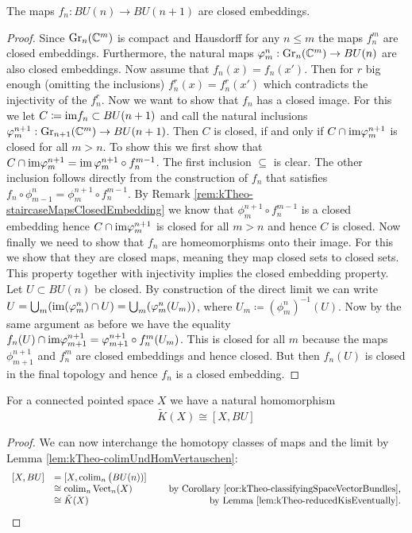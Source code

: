 \begin{lemma}
	The maps $f_n:BU(n)\to BU(n+1)$ are closed embeddings.
\end{lemma}
\begin{proof}
	Since $\operatorname{\mathrm{Gr}}_n(\mathbb{C}^m)$ is compact and Hausdorff for any $n\leq m$ the maps $f_n^m$ are closed embeddings. Furthermore, the natural maps $\varphi^n_m:\operatorname{\mathrm{Gr}}_n(\mathbb{C}^m)\to BU(n)$ are also closed embeddings. Now assume that $f_n(x)=f_n(x')$. Then for $r$ big enough (omitting the inclusions) $f_n^r(x)=f_n^r(x')$ which contradicts the injectivity of the $f_n^r$. Now we want to show that $f_n$ has a closed image. For this we let $C\coloneq \mathrm{im} f_n \subset BU(n+1)$ and call the natural inclusions $\varphi^{n+1}_m: \operatorname{\mathrm{Gr}}_{n+1}(\mathbb{C}^m)\to BU(n+1)$. Then $C$ is closed, if and only if $C\cap \mathrm{im} \varphi_m^{n+1}$ is closed for all $m>n$. To show this we first show that $C\cap \mathrm{im} \varphi_m^{n+1}=\mathrm{im}\, \varphi^{n+1}_m\circ f_n^{m-1}$. The first inclusion $\subseteq$ is clear. The other inclusion follows directly from the construction of $f_n$ that satisfies $f_n\circ \phi^n_{m-1}=\phi^{n+1}_m\circ f^{m-1}_n$. By Remark \ref{rem:kTheo-staircaseMapsClosedEmbedding} we know that $\phi^{n+1}_m \circ f^{m-1}_n$ is a closed embedding hence $C\cap \mathrm{im} \varphi_m^{n+1}$ is closed for all $m>n$ and hence $C$ is closed. Now finally we need to show that $f_n$ are homeomorphisms onto their image. For this we show that they are closed maps, meaning they map closed sets to closed sets. This property together with injectivity implies the closed embedding property.
	Let $U\subset BU(n)$ be closed. By construction of the direct limit we can write $U=\bigcup_m (\mathrm{im}(\varphi^n_m)\cap U)=\bigcup_m (\varphi^n_m(U_m))$, where $U_m\coloneq (\phi^n_m)^{-1}(U)$. Now by the same argument as before we have the equality $f_n(U)\cap \mathrm{im}\varphi^{n+1}_{m+1}= \varphi^{n+1}_{m+1}\circ f^m_n(U_m)$. This is closed for all $m$ because the maps $\phi^{n+1}_{m+1}$ and $f_n^m$ are closed embeddings and hence closed. But then $f_n(U)$ is closed in the final topology and hence $f_n$ is a closed embedding.
\end{proof}
\begin{theorem}\label{thm:kTheo-reducedKgroupAsHomotopy}
	For a connected pointed space $X$ we have a natural homomorphism
	\begin{equation*}
		\tilde{K}(X)\cong [X,BU]
	\end{equation*}
\end{theorem}
\begin{proof}
	We can now interchange the homotopy classes of maps and the limit by Lemma \ref{lem:kTheo-colimUndHomVertauschen}: 
	\begin{equation*}
		\begin{array}{llr}
			[X,BU]	&=[X,\operatorname{\mathrm{colim}}_n\big(BU(n))] &	\\
					&\cong\operatorname{\mathrm{colim}}_n \operatorname{\mathrm{Vect}}_n(X) & \quad \text{ by Corollary \ref{cor:kTheo-classifyingSpaceVectorBundles},}\\
					&\cong \tilde{K}(X) 	  & \quad \text{ by Lemma \ref{lem:kTheo-reducedKisEventually}.}
		\end{array}
	\end{equation*}
\end{proof}
